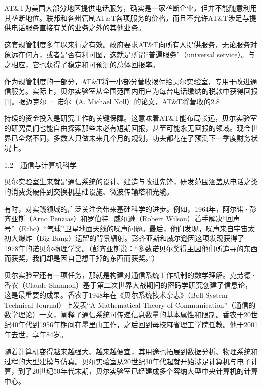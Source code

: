 \documentclass[a4paper,12pt,UTF8,twoside]{ctexbook}
\begin{document}
AT\&T为美国大部分地区提供电话服务，确实是一家垄断企业，但并不能随意利用其垄断地位。联邦和各州管制AT\&T各项服务的价格，而且不允许AT\&T涉足与提供电话服务直接有关的业务之外的其他业务。

这套规管制度多年以来行之有效。政府要求AT\&T向所有人提供服务，无论服务对象远在何方，或者是否有利可图，这就是所谓“普遍服务”（universal service）。与之相应，它也获得了稳定和可预测的总体回报率。

作为规管制度的一部分，AT\&T将一小部分营收拨付给贝尔实验室，专用于改进通信服务。实际上，贝尔实验室从全国范围内用户为每台电话缴纳的税款中获得回报[1]。据迈克尔 · 诺尔（A. Michael Noll）的论文，AT\&T将营收的2.8%

持续的资金投入是研究工作的关键保障。这意味着AT\&T能布局长远，贝尔实验室的研究员们也能自由探索那些未必有短期回报，甚至可能永无回报的领域。现今世界已全然不同，多数人只做未来几个月的规划，功夫都花在了预测下一季度财务状况上。





1.2　通信与计算机科学


贝尔实验室生来就是通信系统的设计、建造与改进先锋，研发范围涵盖从电话之类的消费类硬件到交换机基础设施、微波传输塔和光缆。

有时，对实践领域的广泛关注会带来基础科学的进步。例如，1964年，阿尔诺·彭齐亚斯（Arno Penzias）和罗伯特·威尔逊（Robert Wilson）着手解决“回声号”（Echo）“气球”卫星地面天线的噪声问题。最后，他们发现，噪声来自宇宙太初大爆炸（Big Bang）遗留的背景辐射。彭齐亚斯和威尔逊因这项发现获得了1978年的诺贝尔物理学奖。（彭齐亚斯说：“多数诺贝尔奖得主因他们所追寻的东西而获奖，我们却是因自己想干掉的东西而获奖。”）

贝尔实验室还有一项任务，那就是构建对通信系统工作机制的数学理解。克劳德·香农（Claude Shannon）基于第二次世界大战期间的密码学研究创建了信息论，这是最重要的成果。香农于1948年在《贝尔系统技术杂志》（Bell System Technical Journal）上发表“A Mathematical Theory of Communication”（通信的数学理论）一文，阐释了通信系统可传递信息数量的基本属性和限制。香农于20世纪40年代到1956年期间在墨里山工作，之后回到母校麻省理工学院任教。他于2001年去世，享年84岁。

随着计算机变得越来越强大、越来越便宜，其用途也拓展到数据分析、物理系统和过程的大型建模与仿真。贝尔实验室从20世纪30年代起就开始涉足计算机与电子计算，到了20世纪50年代末期，贝尔实验室已经建成多个容纳大型中央计算机的计算中心。
\end{document}
